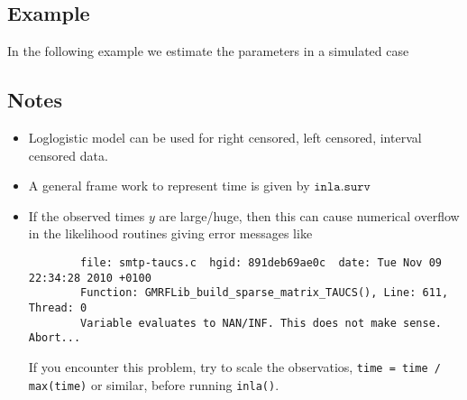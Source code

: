 \documentclass[a4paper,11pt]{article}
\begin{document}
\subsection*{Example}

In the following example we estimate the parameters in a simulated
case 

\subsection*{Notes}

\begin{itemize}
\item Loglogistic model can be used for right censored, left censored,
    interval censored data.
\item A general frame work to represent time is given by
    $\texttt{inla.surv}$
\item If the observed times $y$ are large/huge, then this can cause
    numerical overflow in the likelihood routines giving error
    messages like
\begin{verbatim}
        file: smtp-taucs.c  hgid: 891deb69ae0c  date: Tue Nov 09 22:34:28 2010 +0100
        Function: GMRFLib_build_sparse_matrix_TAUCS(), Line: 611, Thread: 0
        Variable evaluates to NAN/INF. This does not make sense. Abort...
\end{verbatim}
    If you encounter this problem, try to scale the observatios,
    \verb|time = time / max(time)| or similar, before running
    \verb|inla()|. 
\end{itemize}
\end{document}
